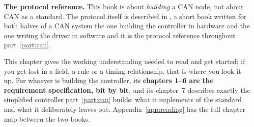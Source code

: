 \begin{aside}
\textbf{The protocol reference.} This book is about \emph{building} a CAN node, not about CAN as a
standard. The protocol itself is described in \canbook, a short book written for both halves of a
CAN system \textemdash{} the one building the controller in hardware and the one writing the driver
in software \textemdash{} and it is the protocol reference throughout part~\ref{part:can}.

This chapter gives the working understanding needed to read  and get started; if you
get lost in a field, a rule or a timing relationship, that is where you look it up. For whoever is
building the controller, its \textbf{chapters 1--6 are the requirement specification, bit by bit},
and its chapter~7 describes exactly the simplified controller part~\ref{part:can} builds: what it
implements of the standard and what it deliberately leaves out. Appendix~\ref{app:reading} has the
full chapter map between the two books.
\end{aside}







